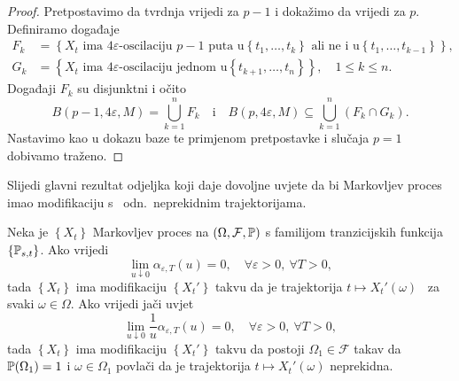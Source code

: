 \documentclass[main.tex]{subfiles}
\begin{document}
\begin{proof}
	Pretpostavimo da tvrdnja vrijedi za \( p-1 \) i dokažimo da vrijedi za \( p \). Definiramo događaje
	\begin{equation}
		\begin{aligned}
			F_k & = \left\{ X_t \text{\ ima\ } 4\varepsilon \text{-oscilaciju\ } p-1 \text{\ puta u} \left\{ t_1, \ldots, t_k \right\} \text{\ ali ne i u} \left\{ t_1, \ldots, t_{k-1} \right\}  \right\}, \\
			G_k & = \left\{ X_t \text{\ ima\ } 4\varepsilon \text{-oscilaciju jednom u} \left\{t_{k+1},\ldots,t_n\right\}\right\}, \quad 1 \le k \le n.
		\end{aligned}
	\end{equation}
	Događaji \( F_k \) su disjunktni i očito
	\begin{equation}
		B(p-1, 4\varepsilon, M) = \bigcup_{k=1}^n F_k \quad \mathrm i \quad B(p, 4\varepsilon, M) \subseteq \bigcup_{k=1}^n (F_k \cap G_k).
	\end{equation}
	Nastavimo kao u dokazu baze te primjenom pretpostavke i slučaja \( p=1 \) dobivamo traženo.
\end{proof}

\bigskip
Slijedi glavni rezultat odjeljka koji daje dovoljne uvjete da bi Markovljev proces imao modifikaciju s \cadlag \ odn.\ neprekidnim trajektorijama.

\begin{teorem}\label{markov-dov}
	Neka je \( \left\{ X_t \right\} \) Markovljev proces na \( \left( \Omega, \mathcal F, \P \right) \) s familijom tranzicijskih funkcija
	\( \left\{ \Ptrans_{s,t} \right\} \). Ako vrijedi
	\begin{equation} \label{markov-dov1}
		\lim\limits_{u \downarrow 0} \alpha_{\varepsilon, T}(u) = 0, \quad \forall \varepsilon >0, \ \forall T > 0,
	\end{equation}
	tada \( \left\{ X_t \right\} \) ima modifikaciju \( \left\{ X_t' \right\} \) takvu
	da je trajektorija \( t \mapsto X_t'(\omega) \) \cadlag \ za svaki \( \omega \in \Omega \).
	Ako vrijedi jači uvjet
	\begin{equation} \label{markov-dov2}
		\lim\limits_{u \downarrow 0} \frac 1u \alpha_{\varepsilon, T}(u) = 0, \quad \forall \varepsilon > 0,\  \forall T > 0,
	\end{equation}
	tada \( \left\{ X_t \right\} \) ima modifikaciju \( \left\{ X_t' \right\} \) takvu da postoji \( \Omega_1 \in \mathcal F \)
	takav da \( \P(\Omega_1) = 1 \) i \( \omega \in \Omega_1 \) povlači da je trajektorija \( t \mapsto X_t'(\omega) \) neprekidna.
\end{teorem}
\end{document}
